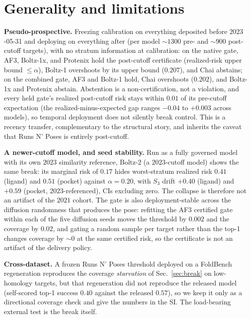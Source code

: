 \documentclass[10pt]{article}
\begin{document}
\section{Generality and limitations}\label{sec:general}
\textbf{Pseudo-prospective.} Freezing calibration on everything deposited before $2023$-05-31 and deploying
on everything after (per model $\sim\!1300$ pre- and $\sim\!900$ post-cutoff targets), with no stratum
information at calibration: on the native gate, AF3, Boltz-1x, and Protenix hold the post-cutoff certificate
(realized-risk upper bound $\le\alpha$), Boltz-1 overshoots by its upper bound ($0.207$), and Chai abstains;
on the combined gate, AF3 and Boltz-1 hold, Chai overshoots ($0.202$), and Boltz-1x and Protenix abstain.
Abstention is a non-certification, not a violation, and every held gate's realized post-cutoff risk stays
within $0.01$ of its pre-cutoff expectation (the realized-minus-expected gap ranges $-0.04$ to $+0.003$
across models), so temporal deployment does not silently break control. This is a
recency transfer, complementary to the structural story, and inherits the caveat that Runs N' Poses is
entirely post-cutoff.

\textbf{A newer-cutoff model, and seed stability.} Run as a fully governed model with its own $2023$
similarity reference, Boltz-2 (a $2023$-cutoff model) shows the same break: its marginal risk of $0.17$ hides
worst-stratum realized risk $0.41$ (ligand) and $0.51$ (pocket) against $\alpha=0.20$, with $S_3$ drift
$+0.40$ (ligand) and $+0.59$ (pocket, $2023$-referenced), CIs excluding zero. The collapse is therefore not
an artifact of the $2021$ cohort. The gate is also deployment-stable across the diffusion randomness that
produces the pose: refitting the AF3 certified gate within each of the five diffusion seeds moves the
threshold by $0.002$ and the coverage by $0.02$, and gating a random sample per target rather than the top-1
changes coverage by $\sim\!0$ at the same certified risk, so the certificate is not an artifact of the
delivery policy.

\textbf{Cross-dataset.} A frozen Runs N' Poses threshold deployed on a FoldBench~\citep{foldbench} regeneration reproduces the
coverage \emph{starvation} of Sec.~\ref{sec:break} on low-homology targets, but that regeneration did not
reproduce the released model (self-scored top-1 success $0.40$ against the released $0.57$), so we keep it
only as a directional coverage check and give the numbers in the SI. The load-bearing external test is the
break itself.
\end{document}
